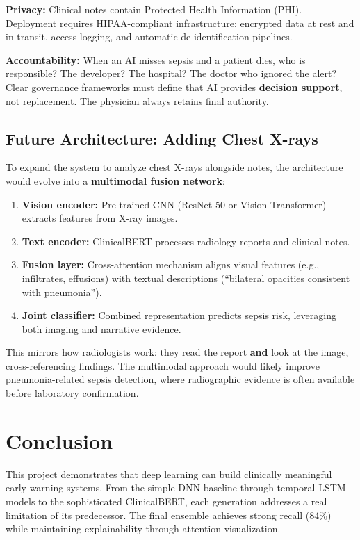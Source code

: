 \documentclass[11pt,a4paper]{article}
\begin{document}
\textbf{Privacy:} Clinical notes contain Protected Health Information (PHI). Deployment requires HIPAA-compliant infrastructure: encrypted data at rest and in transit, access logging, and automatic de-identification pipelines.

\textbf{Accountability:} When an AI misses sepsis and a patient dies, who is responsible? The developer? The hospital? The doctor who ignored the alert? Clear governance frameworks must define that AI provides \textbf{decision support}, not replacement. The physician always retains final authority.

\subsection{Future Architecture: Adding Chest X-rays}

To expand the system to analyze chest X-rays alongside notes, the architecture would evolve into a \textbf{multimodal fusion network}:

\begin{enumerate}
\item \textbf{Vision encoder:} Pre-trained CNN (ResNet-50 or Vision Transformer) extracts features from X-ray images.
\item \textbf{Text encoder:} ClinicalBERT processes radiology reports and clinical notes.
\item \textbf{Fusion layer:} Cross-attention mechanism aligns visual features (e.g., infiltrates, effusions) with textual descriptions (``bilateral opacities consistent with pneumonia'').
\item \textbf{Joint classifier:} Combined representation predicts sepsis risk, leveraging both imaging and narrative evidence.
\end{enumerate}

This mirrors how radiologists work: they read the report \textbf{and} look at the image, cross-referencing findings. The multimodal approach would likely improve pneumonia-related sepsis detection, where radiographic evidence is often available before laboratory confirmation.

\section{Conclusion}

This project demonstrates that deep learning can build clinically meaningful early warning systems. From the simple DNN baseline through temporal LSTM models to the sophisticated ClinicalBERT, each generation addresses a real limitation of its predecessor. The final ensemble achieves strong recall (84\%) while maintaining explainability through attention visualization.
\end{document}
